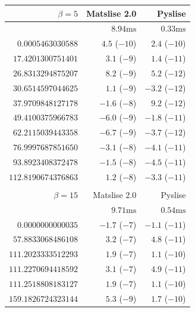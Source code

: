 \begin{table}
    \begin{center}
        \begin{tabular}[]{rrr}
            \toprule
            $\beta=5$           & Matslise 2.0     & Pyslise         \\
            \midrule
                                & $8.94\text{ms}$  & $0.33\text{ms}$ \\
            $0.0005463030588$   & $4.5$ ($-10$)    & $2.4$ ($-10$)   \\
            $17.4201300751401$  & $3.1$ ($-9$)     & $1.4$ ($-11$)   \\
            $26.8313294875207$  & $8.2$ ($-9$)     & $5.2$ ($-12$)   \\
            $30.6514597044625$  & $1.1$ ($-9$)     & $-3.2$ ($-12$)  \\
            $37.9709848127178$  & $-1.6$ ($-8$)    & $9.2$ ($-12$)   \\
            $49.4100375966783$  & $-6.0$ ($-9$)    & $-1.8$ ($-11$)  \\
            $62.2115039443358$  & $-6.7$ ($-9$)    & $-3.7$ ($-12$)  \\
            $76.9997687851650$  & $-3.1$ ($-8$)    & $-4.1$ ($-11$)  \\
            $93.8923408372478$  & $-1.5$ ($-8$)    & $-4.5$ ($-11$)  \\
            $112.8190674376863$ & $1.2$ ($-8$)     & $-3.3$ ($-11$)  \\
                                &                  &                 \\
            \bottomrule
            \toprule
            $\beta=15$          & Matslise 2.0     & Pyslise         \\
            \midrule
                                & $9.71\text{ms}$  & $0.54\text{ms}$ \\
            $0.0000000000035$   & $-1.7$ ($-7$)    & $-1.1$ ($-11$)  \\
            $57.8833068486108$  & $3.2$ ($-7$)     & $4.8$ ($-11$)   \\
            $111.2023333512293$ & $1.9$ ($-7$)     & $1.1$ ($-10$)   \\
            $111.2270694418592$ & $3.1$ ($-7$)     & $4.9$ ($-11$)   \\
            $111.2518808183127$ & $1.9$ ($-7$)     & $1.1$ ($-10$)   \\
            $159.1826724323144$ & $5.3$ ($-9$)     & $1.7$ ($-10$)   \\

\end{tabular}
\end{center}
\end{table}
